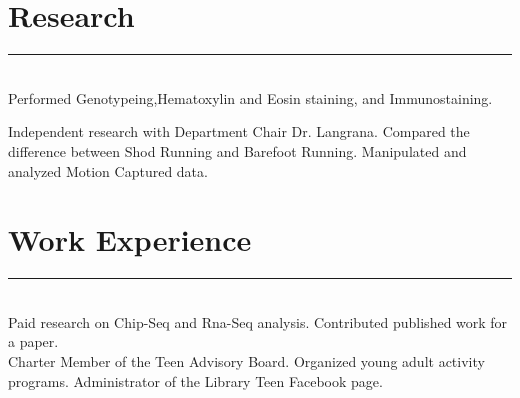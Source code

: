 \documentclass[letterpaper]{deedy-resume} %
\begin{document}
\sectionspace %



\section{Research}
\normalfont
\hrule height .1pt \leavevmode \\
\vspace{2 mm}
\hfill
{}
\hfill
{}
\vspace{1 mm}
Performed Genotypeing,Hematoxylin and Eosin staining, and Immunostaining.	
\sectionspace %
\vspace{2 mm}

\hfill
{}
\hfill
{}
\vspace{1 mm}
 Independent research with Department Chair Dr. Langrana. Compared the difference between Shod Running and Barefoot Running. Manipulated and analyzed Motion Captured data. 


\sectionspace %

\section{Work Experience}
\normalfont
\hrule height .1pt \leavevmode \\
\vspace{2 mm}
\hfill
{}
\hfill
{}
\vspace{1 mm}
Paid research on Chip-Seq and Rna-Seq analysis. Contributed published work for a paper.\\	
\sectionspace %
\vspace{2 mm}
\hfill
{}
\hfill
{}
\vspace{1 mm}
Charter Member of the Teen Advisory Board. Organized young adult activity programs. Administrator of the Library Teen Facebook page. 
\end{document}
